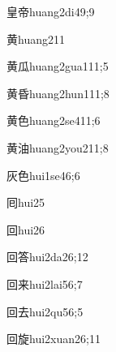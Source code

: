 \begin{verbete}{皇帝}{huang2di4}{9;9}
\end{verbete}

\begin{verbete}{黄}{huang2}{11}
\end{verbete}

\begin{verbete}{黄瓜}{huang2gua1}{11;5}
\end{verbete}

\begin{verbete}{黄昏}{huang2hun1}{11;8}
\end{verbete}

\begin{verbete}{黄色}{huang2se4}{11;6}
\end{verbete}

\begin{verbete}{黄油}{huang2you2}{11;8}
\end{verbete}

\begin{verbete}{灰色}{hui1se4}{6;6}
\end{verbete}

\begin{verbete}{囘}{hui2}{5}
\end{verbete}

\begin{verbete}{回}{hui2}{6}
\end{verbete}

\begin{verbete}{回答}{hui2da2}{6;12}
\end{verbete}

\begin{verbete}{回来}{hui2lai5}{6;7}
\end{verbete}

\begin{verbete}{回去}{hui2qu5}{6;5}
\end{verbete}

\begin{verbete}{回旋}{hui2xuan2}{6;11}
\end{verbete}

